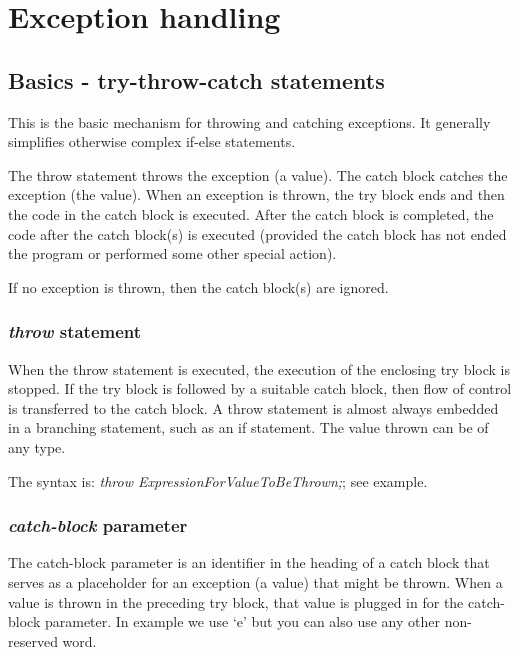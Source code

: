 \section{Exception handling}

\subsection{Basics - try-throw-catch statements}
This is the basic mechanism for throwing and catching exceptions. It generally simplifies
otherwise complex if-else statements.

The throw statement throws the exception (a value). The catch block catches the exception
(the value). When an exception is thrown, the try block ends and then the code in the catch
block is executed. After the catch block is completed, the code after the catch block(s) is
executed (provided the catch block has not ended the program or performed some other special
action).

If no exception is thrown, then the catch block(s) are ignored.

\subsubsection*{\emph{throw} statement}
When the throw statement is executed, the execution of the enclosing try block is stopped. If
the try block is followed by a suitable catch block, then flow of control is transferred to the catch
block. A throw statement is almost always embedded in a branching statement, such as an if
statement. The value thrown can be of any type.

The syntax is: \emph{throw ExpressionForValueToBeThrown;}; see example.

\subsubsection*{\emph{catch-block} parameter}
The catch-block parameter is an identifier in the heading of a catch block that serves as a
placeholder for an exception (a value) that might be thrown. When a value is thrown in the preceding
try block, that value is plugged in for the catch-block parameter. In example we use `e' but you can
also use any other non-reserved word.

